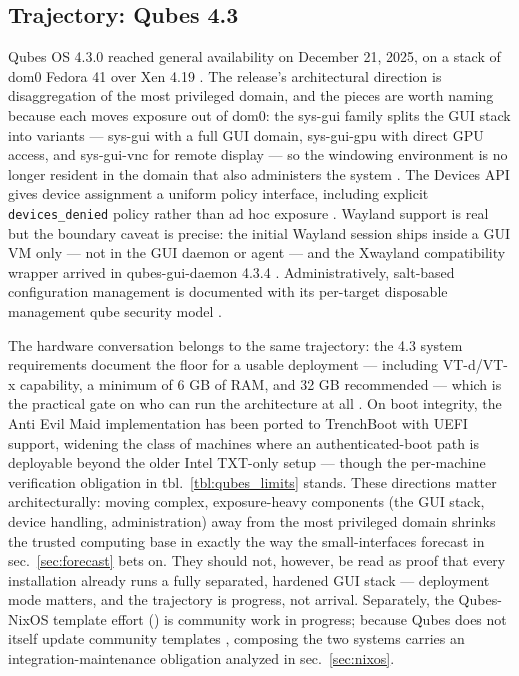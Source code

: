 \documentclass[
  english,
  9pt,
]{extarticle}
\begin{document}
\subsection{Trajectory: Qubes 4.3}\label{trajectory-qubes-4.3}

Qubes OS 4.3.0 reached general availability on December 21, 2025, on a
stack of dom0 Fedora 41 over Xen 4.19
\citep{qubes_430_release, qubes_43_release_notes}. The release's
architectural direction is disaggregation of the most privileged domain,
and the pieces are worth naming because each moves exposure out of dom0:
the sys-gui family splits the GUI stack into variants --- sys-gui with a
full GUI domain, sys-gui-gpu with direct GPU access, and sys-gui-vnc for
remote display --- so the windowing environment is no longer resident in
the domain that also administers the system
\citep{qubes_43_release_notes, qubes_gui_domain}. The Devices API gives
device assignment a uniform policy interface, including explicit
\texttt{devices\_denied} policy rather than ad hoc exposure
\citep{qubes_devices_api}. Wayland support is real but the boundary
caveat is precise: the initial Wayland session ships inside a GUI VM
only --- not in the GUI daemon or agent --- and the Xwayland
compatibility wrapper arrived in qubes-gui-daemon 4.3.4
\citep{qubes_43_release_notes}. Administratively, salt-based
configuration management is documented with its per-target disposable
management qube security model \citep{qubes_salt_administration}.

The hardware conversation belongs to the same trajectory: the 4.3 system
requirements document the floor for a usable deployment --- including
VT-d/VT-x capability, a minimum of 6 GB of RAM, and 32 GB recommended
--- which is the practical gate on who can run the architecture at all
\citep{qubes_43_requirements}. On boot integrity, the Anti Evil Maid
implementation has been ported to TrenchBoot with UEFI support, widening
the class of machines where an authenticated-boot path is deployable
beyond the older Intel TXT-only setup
\citep{trenchboot_aem_uefi, qubes_anti_evil_maid} --- though the
per-machine verification obligation in tbl.~\ref{tbl:qubes_limits}
stands. These directions matter architecturally: moving complex,
exposure-heavy components (the GUI stack, device handling,
administration) away from the most privileged domain shrinks the trusted
computing base in exactly the way the small-interfaces forecast in
sec.~\ref{sec:forecast} bets on. They should not, however, be read as
proof that every installation already runs a fully separated, hardened
GUI stack --- deployment mode matters, and the trajectory is progress,
not arrival. Separately, the Qubes-NixOS template effort
(\citep{qubes_issue_7992}) is community work in progress; because Qubes
does not itself update community templates \citep{qubes_templates},
composing the two systems carries an integration-maintenance obligation
analyzed in sec.~\ref{sec:nixos}.
\end{document}
